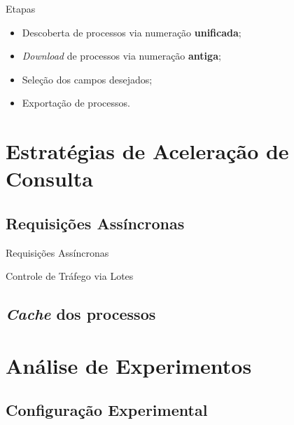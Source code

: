 \begin{frame}{Etapas}
    \begin{itemize}
        \item Descoberta de processos via numeração \textbf{unificada};
        \item \textit{Download} de processos via numeração \textbf{antiga};
        \item Seleção dos campos desejados;
        \item Exportação de processos.
    \end{itemize}
\end{frame}

\section{Estratégias de Aceleração de Consulta}

\subsection{Requisições Assíncronas}


\begin{frame}{Requisições Assíncronas}
\end{frame}

\begin{frame}{Controle de Tráfego via Lotes}
\end{frame}

\subsection{\textit{Cache} dos processos}

\section{Análise de Experimentos}

\subsection{Configuração Experimental}

